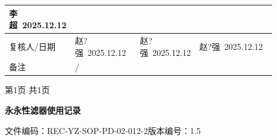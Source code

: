 \documentclass[UTF8,10pt,a4paper,fontset=fandol]{ctexart}
\newcommand{\fieldvalue}[1]{#1}
\newcommand{\handwritten}[1]{#1}
\begin{document}
\begin{tabular}{|p{0.16\linewidth}|p{0.25\linewidth}|p{0.16\linewidth}|p{0.31\linewidth}|}
\fieldvalue{\handwritten{李超\ 2025.12.12}}\\
\hline
复核人/日期 &
\fieldvalue{\handwritten{赵?强\ 2025.12.12}} &
\fieldvalue{\handwritten{赵?强\ 2025.12.12}} &
\fieldvalue{\handwritten{赵?强\ 2025.12.12}}\\
\hline
备注 &
\multicolumn{3}{l|}{
\fieldvalue{\handwritten{/}}}\\
\hline
\end{tabular}

\begin{center}
第1页 共1页
\end{center}

\newpage

\begin{center}
\textbf{永永性滤器使用记录}
\end{center}

\noindent
文件编码：REC-YZ-SOP-PD-02-012-2\hfill 版本编号：1.5
\end{document}
